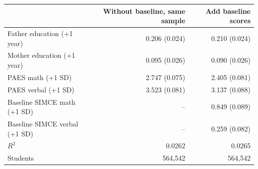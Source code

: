 \begin{tabular}{lrr}
\hline
 & Without baseline, same sample & Add baseline scores \\
\hline
Father education (+1 year) & 0.206 (0.024) & 0.210 (0.024) \\
Mother education (+1 year) & 0.095 (0.026) & 0.090 (0.026) \\
PAES math (+1 SD) & 2.747 (0.075) & 2.405 (0.081) \\
PAES verbal (+1 SD) & 3.523 (0.081) & 3.137 (0.088) \\
Baseline SIMCE math (+1 SD) & -- & 0.849 (0.089) \\
Baseline SIMCE verbal (+1 SD) & -- & 0.259 (0.082) \\
$R^2$ & 0.0262 & 0.0265 \\
Students & 564,542 & 564,542 \\
\hline
\end{tabular}

